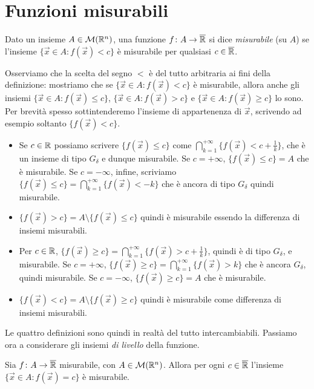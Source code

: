 \section{Funzioni misurabili}
\label{sec:funzioni-misurabili}
\begin{definizione} \label{d:funzione-misurabile}
	Dato un insieme $A\in\mathcal M(\mathbb{R}^n)$, una funzione $f\colon A\to\overline{\mathbb{R}}$ si dice \emph{misurabile} (su $A$) se l'insieme $\{\vec x\in A\colon f(\vec x)<c\}$ è misurabile per qualsiasi $c\in\overline{\mathbb{R}}$.
\end{definizione}
Osserviamo che la scelta del segno $<$ è del tutto arbitraria ai fini della definizione: mostriamo che se $\{\vec x\in A\colon f(\vec x)<c\}$ è misurabile, allora anche gli insiemi $\{\vec x\in A\colon f(\vec x)\leq c\}$, $\{\vec x\in A\colon f(\vec x)>c\}$ e $\{\vec x\in A\colon f(\vec x)\geq c\}$ lo sono.
Per brevità spesso sottintenderemo l'insieme di appartenenza di $\vec x$, scrivendo ad esempio soltanto $\{f(\vec x)<c\}$.
\begin{itemize}
	\item Se $c\in\mathbb{R}$ possiamo scrivere $\{f(\vec x)\leq c\}$ come $\bigcap_{k=1}^{+\infty}\{f(\vec x)<c+\frac1{k}\}$, che è un insieme di tipo $G_\delta$ e dunque misurabile.
		Se $c=+\infty$, $\{f(\vec x)\leq c\}=A$ che è misurabile.
		Se $c=-\infty$, infine, scriviamo $\{f(\vec x)\leq c\}=\bigcap_{k=1}^{+\infty}\{f(\vec x)<-k\}$ che è ancora di tipo $G_\delta$ quindi misurabile.
	\item $\{f(\vec x)>c\}=A\setminus\{f(\vec x)\leq c\}$ quindi è misurabile essendo la differenza di insiemi misurabili.
	\item Per $c\in\mathbb{R}$, $\{f(\vec x)\geq c\}=\bigcap_{k=1}^{+\infty}\{f(\vec x)>c+\frac1{k}\}$, quindi è di tipo $G_\delta$, e misurabile.
		Se $c=+\infty$, $\{f(\vec x)\geq c\}=\bigcap_{k=1}^{+\infty}\{f(\vec x)>k\}$ che è ancora $G_\delta$, quindi misurabile.
		Se $c=-\infty$, $\{f(\vec x)\geq c\}=A$ che è misurabile.
	\item $\{f(\vec x)<c\}=A\setminus\{f(\vec x)\geq c\}$ quindi è misurabile come differenza di insiemi misurabili.
\end{itemize}
Le quattro definizioni sono quindi in realtà del tutto intercambiabili.
Passiamo ora a considerare gli insiemi \emph{di livello} della funzione.
\begin{teorema} \label{t:insiemi-livello-funzione-misurabile}
	Sia $f\colon A\to\overline{\mathbb{R}}$ misurabile, con $A\in\mathcal M(\mathbb{R}^n)$.
	Allora per ogni $c\in\overline{\mathbb{R}}$ l'insieme $\{\vec x\in A\colon f(\vec x)=c\}$ è misurabile.
\end{teorema}
